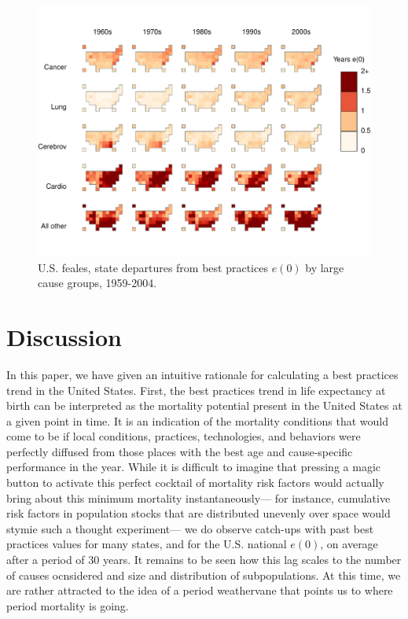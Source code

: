 \documentclass[11pt,oneside,a4paper]{article} %
\begin{document}
\begin{figure}
\centering
\caption{U.S. feales, state departures from best practices $e(0)$ by large cause
groups, 1959-2004.}
\label{fig:depf}
\includegraphics[scale=0.7]{Figures/StatesDecadesF.pdf}
\end{figure}

\FloatBarrier
\section*{Discussion}
In this paper, we have given an intuitive rationale for calculating a best
practices trend in the United States. First, the best practices trend in life
expectancy at birth can be interpreted as the mortality potential present in the
United States at a given point in time. It is an indication of the mortality
conditions that would come to be if local conditions, practices,
technologies, and behaviors were perfectly diffused from those places with the
best age and cause-specific performance in the year. While it is difficult to
imagine that pressing a magic button to activate this perfect cocktail of
mortality risk factors would actually bring about this minimum mortality
instantaneously--- for instance, cumulative risk factors in population
stocks that are distributed unevenly over space would stymie such a thought
experiment--- we do observe catch-ups with past best practices values for many states, and for the
U.S. national $e(0)$, on average after a period of 30 years. It remains to be
seen how this lag scales to the number of causes ocnsidered and size and
distribution of subpopulations. At this time, we are rather attracted to the
idea of a period weathervane that points us to where period mortality is going.


%
\end{document}

